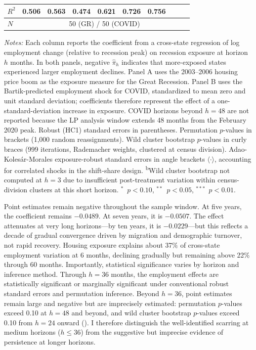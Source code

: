 \documentclass[12pt]{article}
\begin{document}
\begin{table}[H]
\begin{threeparttable}
\begin{tabular}{lccccccccc}
$R^2$ & 0.506 & 0.563 & 0.474 & 0.621 & 0.726 & 0.756 & & &  \\
\midrule
$N$ & \multicolumn{9}{c}{50 (GR) / 50 (COVID)} \\
\bottomrule
\end{tabular}
\begin{tablenotes}[flushleft]
\small
\item \textit{Notes:} Each column reports the coefficient from a cross-state regression of log employment change (relative to recession peak) on recession exposure at horizon $h$ months. In both panels, negative $\hat{\pi}_h$ indicates that more-exposed states experienced larger employment declines. Panel A uses the 2003--2006 housing price boom as the exposure measure for the Great Recession. Panel B uses the Bartik-predicted employment shock for COVID, standardized to mean zero and unit standard deviation; coefficients therefore represent the effect of a one-standard-deviation increase in exposure. COVID horizons beyond $h=48$ are not reported because the LP analysis window extends 48 months from the February 2020 peak. Robust (HC1) standard errors in parentheses. Permutation $p$-values in brackets (1,000 random reassignments). Wild cluster bootstrap $p$-values in curly braces (999 iterations, Rademacher weights, clustered at census division). Adao-Koles\'{a}r-Morales exposure-robust standard errors in angle brackets $\langle\cdot\rangle$, accounting for correlated shocks in the shift-share design. \textsuperscript{b}Wild cluster bootstrap not computed at $h=3$ due to insufficient post-treatment variation within census-division clusters at this short horizon. $^{*}$~$p<0.10$, $^{**}$~$p<0.05$, $^{***}$~$p<0.01$.
\end{tablenotes}
\end{threeparttable}
\label{tab:main}
\end{table}

Point estimates remain negative throughout the sample window. At five years, the coefficient remains $-0.0489$. At seven years, it is $-0.0507$. The effect attenuates at very long horizons---by ten years, it is $-0.0229$---but this reflects a decade of gradual convergence driven by migration and demographic turnover, not rapid recovery. Housing exposure explains about 37\% of cross-state employment variation at 6 months, declining gradually but remaining above 22\% through 60 months. Importantly, statistical significance varies by horizon and inference method. Through $h = 36$ months, the employment effects are statistically significant or marginally significant under conventional robust standard errors and permutation inference. Beyond $h = 36$, point estimates remain large and negative but are imprecisely estimated: permutation $p$-values exceed 0.10 at $h = 48$ and beyond, and wild cluster bootstrap $p$-values exceed 0.10 from $h = 24$ onward (). I therefore distinguish the well-identified scarring at medium horizons ($h \leq 36$) from the suggestive but imprecise evidence of persistence at longer horizons.
\end{document}

